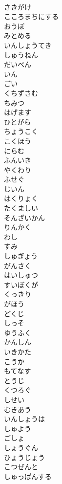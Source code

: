\documentclass[8pt]{extreport}
\begin{document}
\begin{CJK}{UTF8}{min}
\\	さきがけ
\\	こころまちにする
\\	おうぼ
\\	みとめる
\\	いんしょうてき
\\	しゅうねん
\\	だいべん
\\	いん
\\	ごい
\\	くちずさむ
\\	ちみつ
\\	はげます
\\	ひとがら
\\	ちょうこく
\\	こくほう
\\	にらむ
\\	ふんいき
\\	やくわり
\\	ふせぐ
\\	じいん
\\	はくりょく
\\	たくましい
\\	そんざいかん
\\	りんかく
\\	わし
\\	すみ
\\	しゅぎょう
\\	がんさく
\\	はいしゅつ
\\	すいぼくが
\\	くっきり
\\	がほう
\\	どくじ
\\	しっそ
\\	ゆうふく
\\	かんしん
\\	いきかた
\\	こうか
\\	もてなす
\\	とうじ
\\	くつろぐ
\\	しせい
\\	むきあう
\\	いんしょうは
\\	しゅよう
\\	ごしょ
\\	しょうぐん
\\	ひょうじょう
\\	こつぜんと
\\	しゅっぱんする

\end{CJK}
\end{document}
